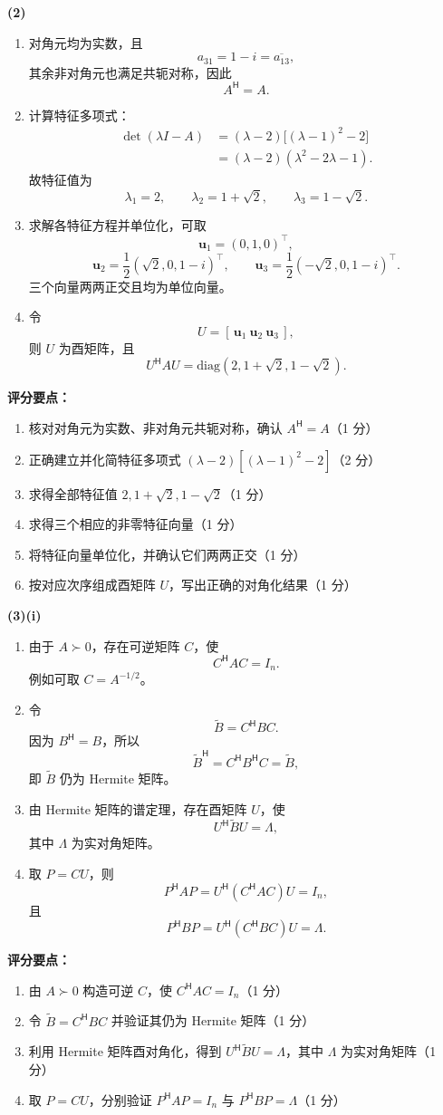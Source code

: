 \documentclass[10pt,a4paper]{exam-zh}
\newcommand{\bvec}[1]{\boldsymbol{#1}}
\newcommand{\ct}{\mathsf{H}}
\newcommand{\diag}{\mathrm{diag}}
\newenvironment{grading}
  {\par\smallskip\Needspace{5\baselineskip}\small
   \noindent\textcolor{gradingred}{\textbf{评分要点：}}
   \begin{enumerate}[label=\textcolor{gradingred}{\arabic*.},
     leftmargin=2.4em,itemsep=0pt,topsep=2pt,parsep=0pt]}
  {\end{enumerate}\smallskip}
\newcommand{\gradeitem}[2]{\item #1（\textcolor{gradingred}{#2 分}）}
\newenvironment{answersteps}
  {\begin{enumerate}[label=\textbf{步骤 \arabic*.},
    leftmargin=4.8em,labelsep=0.6em,itemsep=2pt,topsep=3pt,parsep=0pt]}
  {\end{enumerate}}
\newcommand{\subanswer}[1]{%
  \par\medskip\Needspace{6\baselineskip}\noindent\textbf{#1}\par}
\begin{document}
\begin{solution}
\subanswer{(2)}
\begin{answersteps}
  \item 对角元均为实数，且
  \[
  a_{31}=1-i=\overline{a_{13}},
  \]
  其余非对角元也满足共轭对称，因此
  \[
  A^\ct=A.
  \]
  \item 计算特征多项式：
  \[
  \begin{aligned}
  \det(\lambda I-A)
  &=(\lambda-2)\bigl[(\lambda-1)^2-2\bigr]\\
  &=(\lambda-2)(\lambda^2-2\lambda-1).
  \end{aligned}
  \]
  故特征值为
  \[
  \lambda_1=2,\qquad
  \lambda_2=1+\sqrt2,\qquad
  \lambda_3=1-\sqrt2.
  \]
  \item 求解各特征方程并单位化，可取
  \[
  \bvec u_1=(0,1,0)^\top,
  \]
  \[
  \bvec u_2=\frac12(\sqrt2,0,1-i)^\top,
  \qquad
  \bvec u_3=\frac12(-\sqrt2,0,1-i)^\top.
  \]
  三个向量两两正交且均为单位向量。
  \item 令
  \[
  U=[\,\bvec u_1\ \bvec u_2\ \bvec u_3\,],
  \]
  则 $U$ 为酉矩阵，且
  \[
  \boxed{U^\ct A U=\diag(2,1+\sqrt2,1-\sqrt2)}.
  \]
\end{answersteps}
\begin{grading}
  \gradeitem{核对对角元为实数、非对角元共轭对称，确认 $A^\ct=A$}{1}
  \gradeitem{正确建立并化简特征多项式
  $(\lambda-2)[(\lambda-1)^2-2]$}{2}
  \gradeitem{求得全部特征值 $2,1+\sqrt2,1-\sqrt2$}{1}
  \gradeitem{求得三个相应的非零特征向量}{1}
  \gradeitem{将特征向量单位化，并确认它们两两正交}{1}
  \gradeitem{按对应次序组成酉矩阵 $U$，写出正确的对角化结果}{1}
\end{grading}

\subanswer{(3)(i)}
\begin{answersteps}
  \item 由于 $A\succ0$，存在可逆矩阵 $C$，使
  \[
  C^\ct AC=I_n.
  \]
  例如可取 $C=A^{-1/2}$。
  \item 令
  \[
  \widetilde B=C^\ct BC.
  \]
  因为 $B^\ct=B$，所以
  \[
  \widetilde B^\ct
  =C^\ct B^\ct C
  =\widetilde B,
  \]
  即 $\widetilde B$ 仍为 Hermite 矩阵。
  \item 由 Hermite 矩阵的谱定理，存在酉矩阵 $U$，使
  \[
  U^\ct\widetilde B U=\Lambda,
  \]
  其中 $\Lambda$ 为实对角矩阵。
  \item 取 $P=CU$，则
  \[
  P^\ct AP=U^\ct(C^\ct AC)U=I_n,
  \]
  且
  \[
  P^\ct BP=U^\ct(C^\ct BC)U=\Lambda.
  \]
\end{answersteps}
\begin{grading}
  \gradeitem{由 $A\succ0$ 构造可逆 $C$，使 $C^\ct AC=I_n$}{1}
  \gradeitem{令 $\widetilde B=C^\ct BC$ 并验证其仍为 Hermite 矩阵}{1}
  \gradeitem{利用 Hermite 矩阵酉对角化，得到
  $U^\ct\widetilde BU=\Lambda$，其中 $\Lambda$ 为实对角矩阵}{1}
  \gradeitem{取 $P=CU$，分别验证 $P^\ct AP=I_n$ 与 $P^\ct BP=\Lambda$}{1}
\end{grading}


\end{solution}
\end{document}
